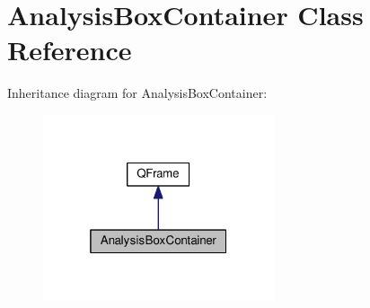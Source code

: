 \hypertarget{classGUI_1_1AnalysisBoxContainer}{}\section{Analysis\+Box\+Container Class Reference}
\label{classGUI_1_1AnalysisBoxContainer}


Inheritance diagram for Analysis\+Box\+Container\+:
\nopagebreak
\begin{figure}[H]
\begin{center}
\leavevmode
\includegraphics[width=193pt]{classGUI_1_1AnalysisBoxContainer__inherit__graph}
\end{center}
\end{figure}
